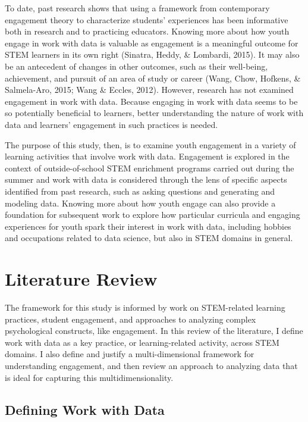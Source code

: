 \documentclass[]{book}
\theoremstyle{definition}
\theoremstyle{definition}
\theoremstyle{definition}
\theoremstyle{remark}
\begin{document}
To date, past research shows that using a framework from contemporary
engagement theory to characterize students' experiences has been
informative both in research and to practicing educators. Knowing more
about how youth engage in work with data is valuable as engagement is a
meaningful outcome for STEM learners in its own right (Sinatra, Heddy,
\& Lombardi, 2015). It may also be an antecedent of changes in other
outcomes, such as their well-being, achievement, and pursuit of an area
of study or career (Wang, Chow, Hofkens, \& Salmela-Aro, 2015; Wang \&
Eccles, 2012). However, research has not examined engagement in work
with data. Because engaging in work with data seems to be so potentially
beneficial to learners, better understanding the nature of work with
data and learners' engagement in such practices is needed.

The purpose of this study, then, is to examine youth engagement in a
variety of learning activities that involve work with data. Engagement
is explored in the context of outside-of-school STEM enrichment programs
carried out during the summer and work with data is considered through
the lens of specific aspects identified from past research, such as
asking questions and generating and modeling data. Knowing more about
how youth engage can also provide a foundation for subsequent work to
explore how particular curricula and engaging experiences for youth
spark their interest in work with data, including hobbies and
occupations related to data science, but also in STEM domains in
general.

\chapter{Literature Review}\label{literature-review}

The framework for this study is informed by work on STEM-related
learning practices, student engagement, and approaches to analyzing
complex psychological constructs, like engagement. In this review of the
literature, I define work with data as a key practice, or
learning-related activity, across STEM domains. I also define and
justify a multi-dimensional framework for understanding engagement, and
then review an approach to analyzing data that is ideal for capturing
this multidimensionality.

\section{Defining Work with Data}\label{defining-work-with-data}
\end{document}

